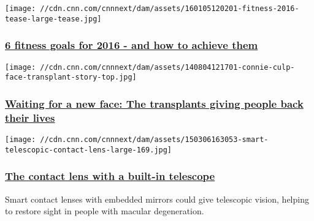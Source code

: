 \href{/2016/01/05/health/fitness-new-years-resolutions-2016-getfit2016/index.html}{}

\texttt{[image: //cdn.cnn.com/cnnnext/dam/assets/160105120201-fitness-2016-tease-large-tease.jpg]}

\hypertarget{6-fitness-goals-for-2016---and-how-to-achieve-them}{%
\subsubsection{\texorpdfstring{\href{/2016/01/05/health/fitness-new-years-resolutions-2016-getfit2016/index.html}{6
fitness goals for 2016 - and how to achieve
them}}{6 fitness goals for 2016 - and how to achieve them}}\label{6-fitness-goals-for-2016---and-how-to-achieve-them}}

\href{/2014/08/06/health/waiting-for-a-new-face/index.html}{}

\texttt{[image: //cdn.cnn.com/cnnnext/dam/assets/140804121701-connie-culp-face-transplant-story-top.jpg]}

\hypertarget{waiting-for-a-new-face-the-transplants-giving-people-back-their-lives-}{%
\subsubsection{\texorpdfstring{\href{/2014/08/06/health/waiting-for-a-new-face/index.html}{Waiting
for a new face: The transplants giving people back their lives
}}{Waiting for a new face: The transplants giving people back their lives }}\label{waiting-for-a-new-face-the-transplants-giving-people-back-their-lives-}}

\href{/2015/03/17/tech/contact-lens-telescope-blindness/index.html}{}

\texttt{[image: //cdn.cnn.com/cnnnext/dam/assets/150306163053-smart-telescopic-contact-lens-large-169.jpg]}

\hypertarget{the-contact-lens-with-a-built-in-telescope}{%
\subsubsection{\texorpdfstring{\href{/2015/03/17/tech/contact-lens-telescope-blindness/index.html}{The
contact lens with a built-in
telescope}}{The contact lens with a built-in telescope}}\label{the-contact-lens-with-a-built-in-telescope}}

Smart contact lenses with embedded mirrors could give telescopic vision,
helping to restore sight in people with macular degeneration.

